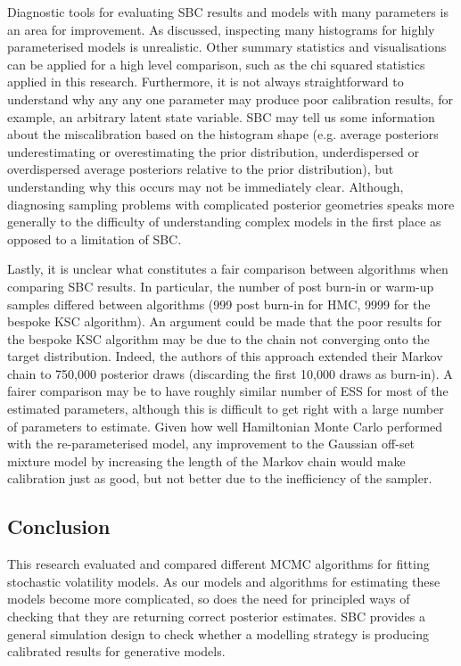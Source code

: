 \documentclass[12pt, a4paper]{article}
\begin{document}
Diagnostic tools for evaluating SBC results and models with many parameters is an area for improvement. As discussed, inspecting many histograms for highly parameterised models is unrealistic. Other summary statistics and visualisations can be applied for a high level comparison, such as the chi squared statistics applied in this research. Furthermore, it is not always straightforward to understand why any any one parameter may produce poor calibration results, for example, an arbitrary latent state variable. SBC may tell us some information about the miscalibration based on the histogram shape (e.g. average posteriors underestimating or overestimating the prior distribution, underdispersed or overdispersed average posteriors relative to the prior distribution), but understanding why this occurs may not be immediately clear. Although, diagnosing sampling problems with complicated posterior geometries speaks more generally to the difficulty of understanding complex models in the first place as opposed to a limitation of SBC.

Lastly, it is unclear what constitutes a fair comparison between algorithms when comparing SBC results. In particular, the number of post burn-in or warm-up samples differed between algorithms (999 post burn-in for HMC, 9999 for the bespoke KSC algorithm). An argument could be made that the poor results for the bespoke KSC algorithm may be due to the chain not converging onto the target distribution. Indeed, the authors of this approach extended their Markov chain to 750,000 posterior draws (discarding the first 10,000 draws as burn-in). A fairer comparison may be to have roughly similar number of ESS for most of the estimated parameters, although this is difficult to get right with a large number of parameters to estimate. Given how well Hamiltonian Monte Carlo performed with the re-parameterised model, any improvement to the Gaussian off-set mixture model by increasing the length of the Markov chain would make calibration just as good, but not better due to the inefficiency of the sampler. 

\subsection{Conclusion}
This research evaluated and compared different MCMC algorithms for fitting stochastic volatility models. As our models and algorithms for estimating these models become more complicated, so does the need for principled ways of checking that they are returning correct posterior estimates. SBC provides a general simulation design to check whether a modelling strategy is producing calibrated results for generative models.
\end{document}
